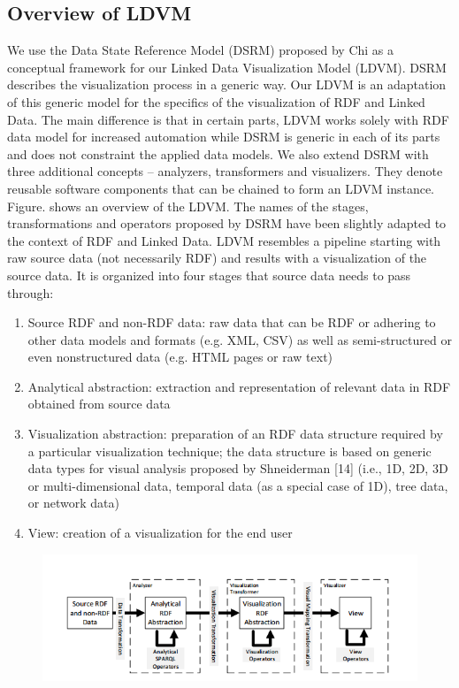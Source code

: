 \documentclass[a4paper,12pt,oneside]{report}
\begin{document}
{{{\subsection{Overview of LDVM}
{We use the Data State Reference Model (DSRM) proposed by Chi  as a conceptual framework for our Linked Data Visualization Model (LDVM). DSRM describes the visualization process in a generic way. Our LDVM is an adaptation of this generic model
for the specifics of the visualization of RDF and Linked Data. The main difference is that in certain parts, LDVM works solely with RDF data model for increased automation while DSRM is generic in each of its parts and does not constraint the applied data
models. We also extend DSRM with three additional concepts – analyzers, transformers and visualizers. They denote reusable software components that can be chained to form an LDVM instance. Figure. shows an overview of the LDVM. The names of the
stages, transformations and operators proposed by DSRM have been slightly adapted to the context of RDF and Linked Data. LDVM resembles a pipeline starting with raw source data (not necessarily RDF) and results with a visualization of the source data. It
is organized into four stages that source data needs to pass through:
\begin{enumerate}
\item{Source RDF and non-RDF data: raw data that can be RDF or adhering to other data models and formats (e.g. XML, CSV) as well as semi-structured or even nonstructured data (e.g. HTML pages or raw text)}
\item{Analytical abstraction: extraction and representation of relevant data in RDF obtained from source data}
\item{Visualization abstraction: preparation of an RDF data structure required by a particular visualization technique; the data structure is based on generic data types for visual analysis proposed by Shneiderman [14] (i.e., 1D, 2D, 3D or multi-dimensional
data, temporal data (as a special case of 1D), tree data, or network data) }
\item{View: creation of a visualization for the end user}
\end{enumerate}
\begin{figure}[h!]
\centering
\includegraphics[width=1\textwidth]{Capture18}

\end{figure}}}}}
\end{document}
